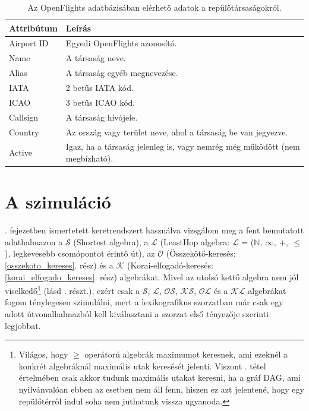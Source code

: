     \begin{table}[ht]
      \footnotesize
      \centering
      \begin{tabular}{ | l | l |}
      \hline
      Attribútum & Leírás \\ \hline
      Airport ID & Egyedi OpenFlights azonosító.\\
      Name & A társaság neve.\\
      Alias & A társaság egyéb megnevezése.\\
      IATA & 2 betűs IATA kód.\\
      ICAO & 3 betűs ICAO kód.\\
      Callsign & A társaság hívójele.\\
      Country & Az ország vagy terület neve, ahol a társaság be van jegyezve.\\
      Active & Igaz, ha a társaság jelenleg is, vagy nemrég még működött (nem megbízható).\\
      \hline
      \end{tabular}
      \caption{Az OpenFlights adatbázisában elérhető adatok a repülőtársaságokról.}
      \label{tab:table_repulesitarsasagok}
    \end{table}

  \section{A szimuláció}
  . fejezetben ismertetett keretrendszert használva vizsgálom meg a fent bemutatott adathalmazon a $\mathcal{S}$ (Shortest algebra), a $\mathcal{L}$ (LeastHop algebra: $\mathcal{L}$ = ($\mathbb{N},~\infty,~+,~\leq$), legkevesebb csomópontot érintő út), az $\mathcal{O}$ (Összekötő-keresés: \ref{osszekoto_kereses}. rész) és a $\mathcal{K}$ (Korai-elfogadó-keresés: \ref{korai_elfogado_kereses}. rész) algebrákat. Mivel az utolsó kettő algebra nem jól viselkedő\footnote{Világos, hogy $\geq$ operátorú algebrák maximumot keresnek, ami ezeknél a konkrét algebráknál maximális utak keresését jelenti. Viszont . tétel értelmében csak akkor tudunk maximális utakat keresni, ha a gráf DAG, ami nyilvánvalóan ebben az esetben nem áll fenn, hiszen ez azt jelentené, hogy egy repülőtérről indul soha nem juthatunk vissza ugyanoda.} (lásd . részt.), ezért csak a $\mathcal{S}$, $\mathcal{L}$, $\mathcal{OS}$, $\mathcal{KS}$, $\mathcal{OL}$ és a $\mathcal{KL}$ algebrákat fogom ténylegesen szimulálni, mert a lexikografikus szorzatban már csak egy adott útvonalhalmazból kell kiválasztani a szorzat első tényezője szerinti legjobbat.

